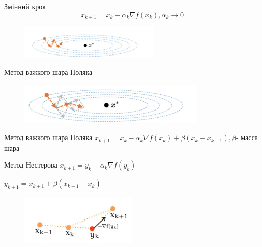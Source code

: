 \documentclass[a4paper, 14pt]{beamer}
\begin{document}
\begin{frame}{Змінний крок}
    $$x_{k+1} = x_k - \alpha_k \nabla f(x_k), \alpha_k \rightarrow 0$$
    \begin{figure}
        \includegraphics[width = 0.6\textwidth]{imgs/gradient.png}
    \end{figure}
\end{frame}

\begin{frame}{Метод важкого шара Поляка}
    \begin{figure}
        \includegraphics[width = 0.8\textwidth]{imgs/polyak.png}
    \end{figure}
\end{frame}

\begin{frame}{Метод важкого шара Поляка}
    $x_{k + 1} = x_k - \alpha_k \nabla f(x_k) + \beta (x_k - x_{k-1}), 
    \beta $- масса шара 
\end{frame}

\begin{frame}{Метод Нестерова}
    $x_{k + 1} = y_k - \alpha_k \nabla f(y_k) $ 


    $y_{k+1} = x_{k+1} + \beta (x_{k+1} - x_k)$
    \begin{figure}
        \includegraphics[width = 0.5\textwidth]{imgs/nesterov.png}
    \end{figure}
\end{frame}
\end{document}
